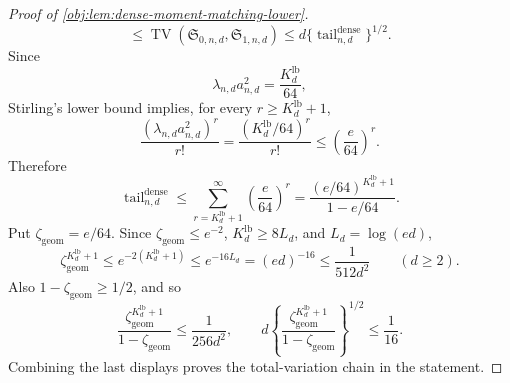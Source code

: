 \documentclass[11pt]{article}
\begin{document}
\begin{proof}[Proof of \cref{obj:lem:dense-moment-matching-lower}]
\[\le
\operatorname{TV}(\mathfrak S_{0,n,d},\mathfrak S_{1,n,d})
\le
d\{\operatorname{tail}_{n,d}^{\mathrm{dense}}\}^{1/2}.
\]
Since
\[
\lambda_{n,d}a_{n,d}^2=\frac{K_d^{\mathrm{lb}}}{64},
\]
Stirling's lower bound implies, for every \(r\ge K_d^{\mathrm{lb}}+1\),
\[
\frac{(\lambda_{n,d}a_{n,d}^2)^r}{r!}
=
\frac{(K_d^{\mathrm{lb}}/64)^r}{r!}
\le
\left(\frac e{64}\right)^r.
\]
Therefore
\[
\operatorname{tail}_{n,d}^{\mathrm{dense}}
\le
\sum_{r=K_d^{\mathrm{lb}}+1}^\infty \left(\frac e{64}\right)^r
=
\frac{(e/64)^{K_d^{\mathrm{lb}}+1}}{1-e/64}.
\]
Put \(\zeta_{\mathrm{geom}}=e/64\). Since \(\zeta_{\mathrm{geom}}\le e^{-2}\), \(K_d^{\mathrm{lb}}\ge8L_d\), and \(L_d=\log(ed)\),
\[
\zeta_{\mathrm{geom}}^{K_d^{\mathrm{lb}}+1}
\le
e^{-2(K_d^{\mathrm{lb}}+1)}
\le
e^{-16L_d}
=
(ed)^{-16}
\le
\frac{1}{512d^2}
\qquad(d\ge2).
\]
Also \(1-\zeta_{\mathrm{geom}}\ge1/2\), and so
\[
\frac{\zeta_{\mathrm{geom}}^{K_d^{\mathrm{lb}}+1}}{1-\zeta_{\mathrm{geom}}}
\le
\frac{1}{256d^2},
\qquad
d\left\{\frac{\zeta_{\mathrm{geom}}^{K_d^{\mathrm{lb}}+1}}{1-\zeta_{\mathrm{geom}}}\right\}^{1/2}
\le
\frac1{16}.
\]
Combining the last displays proves the total-variation chain in the statement.


\end{proof}
\end{document}
